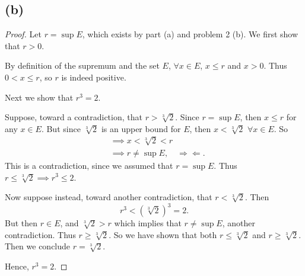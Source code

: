 \documentclass{article}
\begin{document}
\subsection*{(b)}
\begin{proof}
	Let $r = \sup{E}$, which exists by part (a) and problem 2 (b). We first show that $r>0$. 
	
	By definition of the supremum and the set $E$, $\forall x \in E$, $x\leq r$ and $x>0$. Thus $0<x\leq r$, so $r$ is indeed positive.
	
	Next we show that $r^3 = 2$. 
	
	Suppose, toward a contradiction, that $r > \sqrt[3]{2}$. Since $r = \sup{E}$, then $x\leq r$ for any $x \in E$. But since $\sqrt[3]{2}$ is an upper bound for $E$, then $x < \sqrt[3]{2}$ $\forall x\in E$. So 
	\begin{align}
		&\implies x < \sqrt[3]{2} < r \\
		&\implies r \neq \sup{E}, \quad \Rightarrow\Leftarrow.
	\end{align}
	This is a contradiction, since we assumed that $r = \sup{E}$. Thus $r \leq \sqrt[3]{2} \implies r^3 \leq 2$.
	
	Now suppose instead, toward another contradiction, that $r<\sqrt[3]{2}$. Then
	\begin{equation}
		r^3 < \left(\sqrt[3]{2}\right)^3 = 2.
	\end{equation}
	But then $r\in E$, and $\sqrt[3]{2}>r$ which implies that $r \neq \sup{E}$, another contradiction. Thus $r \geq \sqrt[3]{2}$. So we have shown that both $r \leq \sqrt[3]{2}$ and $r \geq \sqrt[3]{2}$. Then we conclude $r=\sqrt[3]{2}$.
	
	Hence, $r^3 = 2$.
\end{proof}
\end{document}

